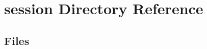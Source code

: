 \section{session Directory Reference}
\label{dir_fa965d733c2fba3912d22950178dead3}
\subsection*{Files}
\begin{DoxyCompactItemize}
\end{DoxyCompactItemize}
